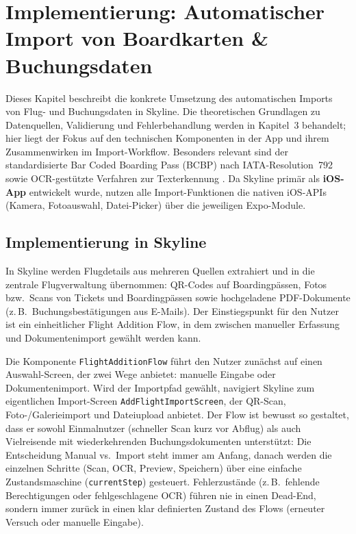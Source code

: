 \chapter{Implementierung: Automatischer Import von Boardkarten \& Buchungsdaten}\label{chapter:import}

Dieses Kapitel beschreibt die konkrete Umsetzung des automatischen Imports von Flug- und Buchungsdaten in Skyline.
Die theoretischen Grundlagen zu Datenquellen, Validierung und Fehlerbehandlung werden in Kapitel~3 behandelt; hier liegt der Fokus auf den technischen Komponenten in der App und ihrem Zusammenwirken im Import-Workflow.
Besonders relevant sind der standardisierte Bar Coded Boarding Pass (BCBP) nach IATA-Resolution~792 \cite{iataBCBP} sowie OCR-gestützte Verfahren zur Texterkennung \cite{mlKitTextRecognition,tesseractOcr}.
Da Skyline primär als \textbf{iOS-App} entwickelt wurde, nutzen alle Import-Funktionen die nativen iOS-APIs (Kamera, Fotoauswahl, Datei-Picker) über die jeweiligen Expo-Module.

\section{Implementierung in Skyline}

In Skyline werden Flugdetails aus mehreren Quellen extrahiert und in die zentrale Flugverwaltung übernommen:
QR-Codes auf Boardingpässen, Fotos bzw.\ Scans von Tickets und Boardingpässen sowie hochgeladene PDF-Dokumente (z.\,B.\ Buchungsbestätigungen aus E-Mails).
Der Einstiegspunkt für den Nutzer ist ein einheitlicher \glqq Flight Addition Flow\grqq{}, in dem zwischen manueller Erfassung und Dokumentenimport gewählt werden kann.

Die Komponente \texttt{FlightAdditionFlow} führt den Nutzer zunächst auf einen Auswahl-Screen, der zwei Wege anbietet:
manuelle Eingabe oder Dokumentenimport.
Wird der Importpfad gewählt, navigiert Skyline zum eigentlichen Import-Screen \texttt{AddFlightImportScreen}, der QR-Scan, Foto-/Galerieimport und Dateiupload anbietet.
Der Flow ist bewusst so gestaltet, dass er sowohl Einmalnutzer (schneller Scan kurz vor Abflug) als auch Vielreisende mit wiederkehrenden Buchungsdokumenten unterstützt:
Die Entscheidung \glqq Manual vs.\ Import\grqq{} steht immer am Anfang, danach werden die einzelnen Schritte (Scan, OCR, Preview, Speichern) über eine einfache Zustandsmaschine (\texttt{currentStep}) gesteuert.
Fehlerzustände (z.\,B.\ fehlende Berechtigungen oder fehlgeschlagene OCR) führen nie in einen \glqq Dead-End\grqq{}, sondern immer zurück in einen klar definierten Zustand des Flows (erneuter Versuch oder manuelle Eingabe).

